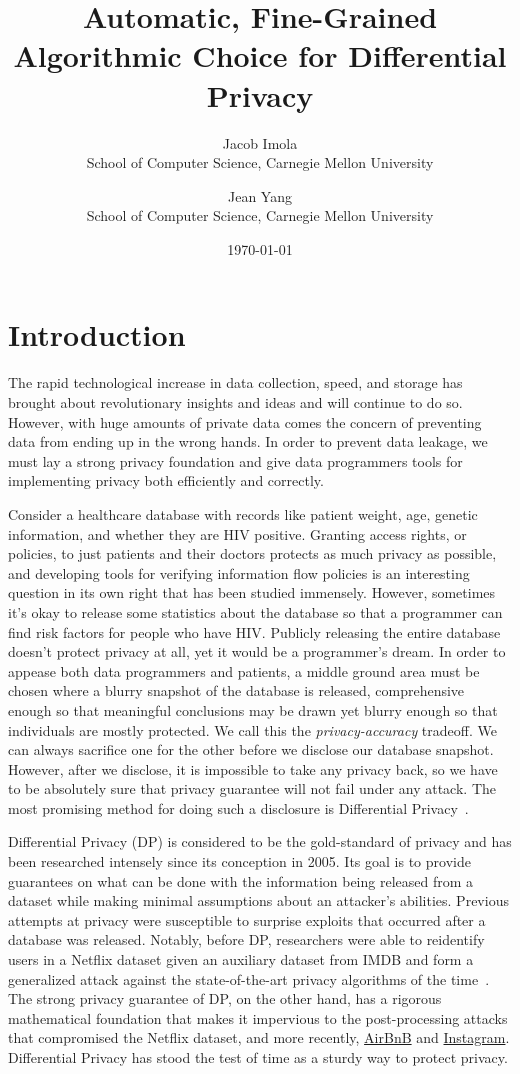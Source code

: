 \documentclass[11pt]{report}
\title{Automatic, Fine-Grained Algorithmic Choice for Differential Privacy}
\date{\today}
\author{Jacob Imola\\ School of Computer Science, Carnegie Mellon University\and Jean Yang\\ School of Computer Science, Carnegie Mellon University}
\begin{document}
\maketitle
\chapter{Introduction}
The rapid technological increase in data collection, speed, and storage has brought about revolutionary insights and ideas and will continue to do so. However, with huge amounts of private data comes the concern of preventing data from ending up in the wrong hands. In order to prevent data leakage, we must lay a strong privacy foundation and give data programmers tools for implementing privacy both efficiently and correctly.

Consider a healthcare database with records like patient weight, age, genetic information, and whether they are HIV positive. Granting access rights, or policies, to just patients and their doctors protects as much privacy as possible, and developing tools for verifying information flow policies is an interesting question in its own right that has been studied immensely. However, sometimes it's okay to release some statistics about the database so that a programmer can find risk factors for people who have HIV. Publicly releasing the entire database doesn't protect privacy at all, yet it would be a programmer's dream. In order to appease both data programmers and patients, a middle ground area must be chosen where a blurry snapshot of the database is released, comprehensive enough so that meaningful conclusions may be drawn yet blurry enough so that individuals are mostly protected. We call this the \emph{privacy-accuracy} tradeoff. We can always sacrifice one for the other before we disclose our database snapshot. However, after we disclose, it is impossible to take any privacy back, so we have to be absolutely sure that privacy guarantee will not fail under any attack. The most promising method for doing such a disclosure is Differential Privacy~\cite{Dwork:2006}.

Differential Privacy (DP) is considered to be the gold-standard of privacy and has been researched intensely since its conception in 2005. Its goal is to provide guarantees on what can be done with the information being released from a dataset while making minimal assumptions about an attacker's abilities. Previous attempts at privacy were susceptible to surprise exploits that occurred after a database was released. Notably, before DP, researchers were able to reidentify users in a Netflix dataset given an auxiliary dataset from IMDB and form a generalized attack against the state-of-the-art privacy algorithms of the time~\cite{Narayanan:2006}. The strong privacy guarantee of DP, on the other hand, has a rigorous mathematical foundation that makes it impervious to the post-processing attacks that compromised the Netflix dataset, and more recently, \href{https://hackernoon.com/how-to-rob-an-airbnb-252e7e7eda44}{AirBnB} and \href{https://gizmodo.com/this-is-almost-certainly-james-comey-s-twitter-account-1793843641}{Instagram}. Differential Privacy has stood the test of time as a sturdy way to protect privacy.
\end{document}
